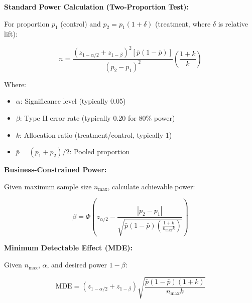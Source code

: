 \textbf{Standard Power Calculation (Two-Proportion Test):}

For proportion $p_1$ (control) and $p_2 = p_1(1 + \delta)$ (treatment, where $\delta$ is relative lift):

\begin{equation}
n = \frac{(z_{1-\alpha/2} + z_{1-\beta})^2 [\bar{p}(1-\bar{p})]}{(p_2 - p_1)^2} \left(\frac{1 + k}{k}\right)
\end{equation}

Where:
\begin{itemize}
    \item $\alpha$: Significance level (typically 0.05)
    \item $\beta$: Type II error rate (typically 0.20 for 80\% power)
    \item $k$: Allocation ratio (treatment/control, typically 1)
    \item $\bar{p} = (p_1 + p_2)/2$: Pooled proportion
\end{itemize}

\textbf{Business-Constrained Power:}

Given maximum sample size $n_{\max}$, calculate achievable power:

\begin{equation}
\beta = \Phi\left(z_{\alpha/2} - \frac{|p_2 - p_1|}{\sqrt{\bar{p}(1-\bar{p}) \left(\frac{1+k}{n_{\max} k}\right)}}\right)
\end{equation}

\textbf{Minimum Detectable Effect (MDE):}

Given $n_{\max}$, $\alpha$, and desired power $1-\beta$:

\begin{equation}
\text{MDE} = (z_{1-\alpha/2} + z_{1-\beta}) \sqrt{\frac{\bar{p}(1-\bar{p})(1+k)}{n_{\max} k}}
\end{equation}

